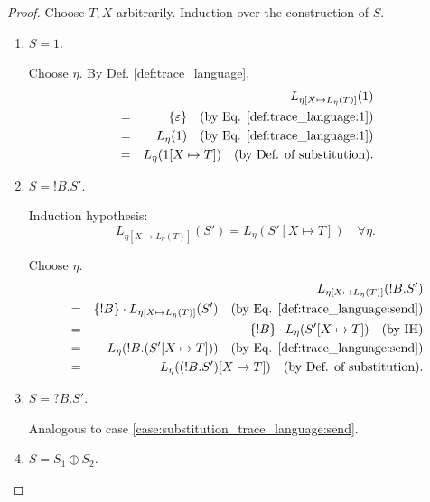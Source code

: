 \documentclass{llncs}
\newcommand*{\send}{\mathord{!}}
\newcommand*{\recv}{\mathord{?}}
\newcommand*{\echoice}{\oplus}
\newcommand*{\concat}{\cdot}
\renewcommand*{\|}{\;|\;}
\renewcommand*{\epsilon}{\varepsilon}
\begin{document}
\begin{proof}
  Choose $T, X$ arbitrarily. Induction over the construction of $S$.
  \begin{enumerate}
    \item
      \label{case:substitution_trace_language:1}
      $S = 1$.

      Choose $\eta$. By Def. \ref{def:trace_language},
      \begin{eqnarray*}
        &&  L_{\eta[X \mapsto L_\eta(T)]}(1) \\
        &=& \{\epsilon\}
            \quad \text{(by Eq. \ref{def:trace_language:1})} \\
        &=& L_\eta(1)
            \quad \text{(by Eq. \ref{def:trace_language:1})} \\
        &=& L_\eta(1[X \mapsto T])
            \quad \text{(by Def. of substitution)}.
      \end{eqnarray*}

    \item
      \label{case:substitution_trace_language:send}
      $S = \send B.S'$.

      Induction hypothesis:
      \begin{equation*}
        L_{\eta[X \mapsto L_\eta(T)]}(S') = L_\eta(S'[X \mapsto T]) \quad \forall \eta.
      \end{equation*}

      Choose $\eta$.
      \begin{eqnarray*}
        &&  L_{\eta[X \mapsto L_\eta(T)]}(\send B.S') \\
        &=& \{\send B\} \concat L_{\eta[X \mapsto L_\eta(T)]}(S')
            \quad \text{(by Eq. \ref{def:trace_language:send})} \\
        &=& \{\send B\} \concat L_\eta(S'[X \mapsto T])
            \quad \text{(by IH)} \\
        &=& L_\eta(\send B.(S'[X \mapsto T]))
            \quad \text{(by Eq. \ref{def:trace_language:send})} \\
        &=& L_\eta((\send B.S')[X \mapsto T])
            \quad \text{(by Def. of substitution)}.
      \end{eqnarray*}

    \item
      \label{case:substitution_trace_language:recv}
      $S = \recv B.S'$.

      Analogous to case \ref{case:substitution_trace_language:send}.

    \item
      \label{case:substitution_trace_language:echoice}
      $S = S_1 \echoice S_2$.


\end{enumerate}
\end{proof}
\end{document}
